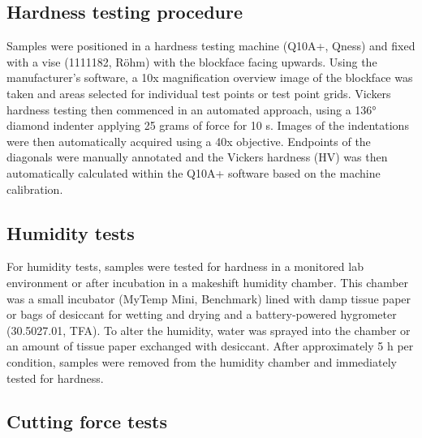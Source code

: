 \documentclass{article}
\begin{document}

\subsection*{Hardness testing procedure}

Samples were positioned in a hardness testing machine (Q10A+, Qness) and fixed with a vise (1111182, Röhm) with the blockface facing upwards. Using the manufacturer’s software, a 10x magnification overview image of the blockface was taken and areas selected for individual test points or test point grids. Vickers hardness testing then commenced in an automated approach, using a 136° diamond indenter applying 25 grams of force for 10 s. Images of the indentations were then automatically acquired using a 40x objective. Endpoints of the diagonals were manually annotated and the Vickers hardness (HV) was then automatically calculated within the Q10A+ software based on the machine calibration.

\subsection*{Humidity tests}

For humidity tests, samples were tested for hardness in a monitored lab environment or after incubation in a makeshift humidity chamber. This chamber was a small incubator (MyTemp Mini, Benchmark) lined with damp tissue paper or bags of desiccant for wetting and drying and a battery-powered hygrometer (30.5027.01, TFA). To alter the humidity, water was sprayed into the chamber or an amount of tissue paper exchanged with desiccant. After approximately 5 h per condition, samples were removed from the humidity chamber and immediately tested for hardness.

\subsection*{Cutting force tests}
\end{document}
